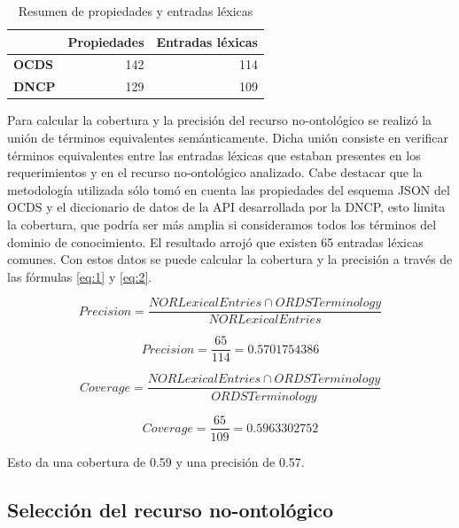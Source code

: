 \begin{table}[!htb]
\centering
\caption{Resumen de propiedades y entradas léxicas}
\label{resumen propiedades}
\begin{tabular}{|l|r|r|}
\hline
 & \textbf{Propiedades} & \textbf{Entradas léxicas}\\ \hline
 \textbf{OCDS} & 142 & 114\\ \hline
 \textbf{DNCP} & 129 & 109 \\ \hline
\end{tabular}
\end{table}

Para calcular la cobertura y la precisión del recurso no-ontológico se realizó la unión de términos equivalentes semánticamente. Dicha unión consiste en verificar términos equivalentes entre las entradas léxicas que estaban presentes en los requerimientos y en el recurso no-ontológico analizado. Cabe destacar que la metodología utilizada sólo tomó en cuenta las propiedades del esquema JSON del OCDS y el diccionario de datos de la API desarrollada por la DNCP, esto limita la cobertura, que podría ser más amplia si consideramos todos los términos del dominio de conocimiento. El resultado arrojó que existen 65 entradas léxicas comunes. Con estos datos se puede calcular la cobertura y la precisión a través de las  fórmulas \ref{eq:1} y \ref{eq:2}.

\begin{equation}
    \label{eq:1}
    Precision =  \frac{{NORLexicalEntries}\cap{ORDSTerminology} }{{NORLexicalEntries}}
\end{equation}

\begin{equation}
    \label{eq:3}
    Precision =  \frac{65}{114} = 0.5701754386
\end{equation}

\begin{equation}
    \label{eq:2}
     Coverage = \frac{{NORLexicalEntries}\cap{ORDSTerminology}}{{ORDSTerminology}}
\end{equation}

\begin{equation}
    \label{eq:4}
    Coverage =  \frac{65}{109} = 0.5963302752
\end{equation}

Esto da una cobertura de 0.59 y una precisión de 0.57.


\subsection{Selección del recurso no-ontológico}

